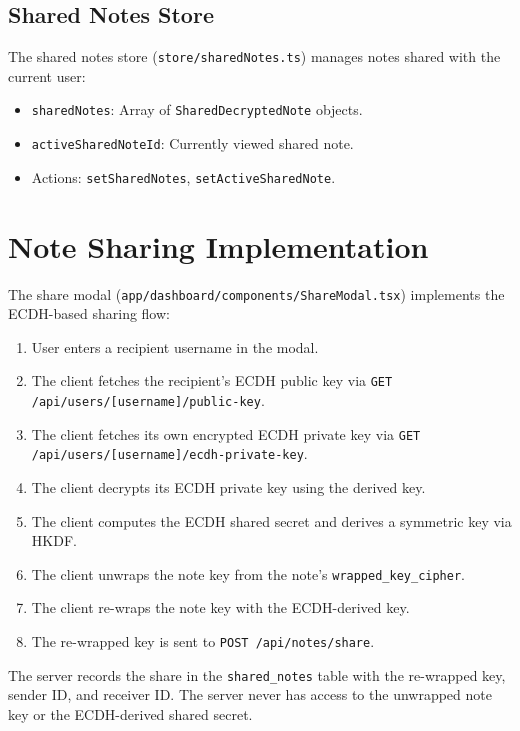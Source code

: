 \subsection{Shared Notes Store}

The shared notes store (\texttt{store/sharedNotes.ts}) manages notes shared with the current user:
\begin{itemize}
    \item \texttt{sharedNotes}: Array of \texttt{SharedDecryptedNote} objects.
    \item \texttt{activeSharedNoteId}: Currently viewed shared note.
    \item Actions: \texttt{setSharedNotes}, \texttt{setActiveSharedNote}.
\end{itemize}

\section{Note Sharing Implementation}

The share modal (\texttt{app/dashboard/components/ShareModal.tsx}) implements the ECDH-based sharing flow:

\begin{enumerate}
    \item User enters a recipient username in the modal.
    \item The client fetches the recipient's ECDH public key via \texttt{GET /api/users/[username]/public-key}.
    \item The client fetches its own encrypted ECDH private key via \texttt{GET /api/users/[username]/ecdh-private-key}.
    \item The client decrypts its ECDH private key using the derived key.
    \item The client computes the ECDH shared secret and derives a symmetric key via HKDF.
    \item The client unwraps the note key from the note's \texttt{wrapped\_key\_cipher}.
    \item The client re-wraps the note key with the ECDH-derived key.
    \item The re-wrapped key is sent to \texttt{POST /api/notes/share}.
\end{enumerate}

The server records the share in the \texttt{shared\_notes} table with the re-wrapped key, sender ID, and receiver ID. The server never has access to the unwrapped note key or the ECDH-derived shared secret.

